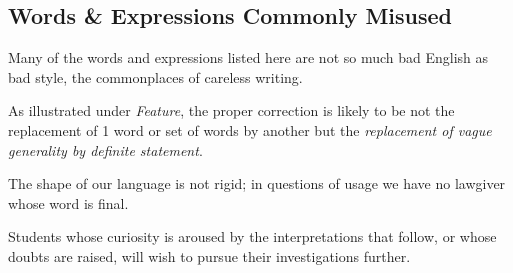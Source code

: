 \documentclass{article}
\begin{document}

\subsection{Words \& Expressions Commonly Misused}
Many of the words and expressions listed here are not so much bad English as bad style, the commonplaces of careless writing.

As illustrated under {\it Feature}, the proper correction is likely to be not the replacement of 1 word or set of words by another but the {\it replacement of vague generality by definite statement}.

%
The shape of our language is not rigid; in questions of usage we have no lawgiver whose word is final.

Students whose curiosity is aroused by the interpretations that follow, or whose doubts are raised, will wish to pursue their investigations further.
\end{document}
